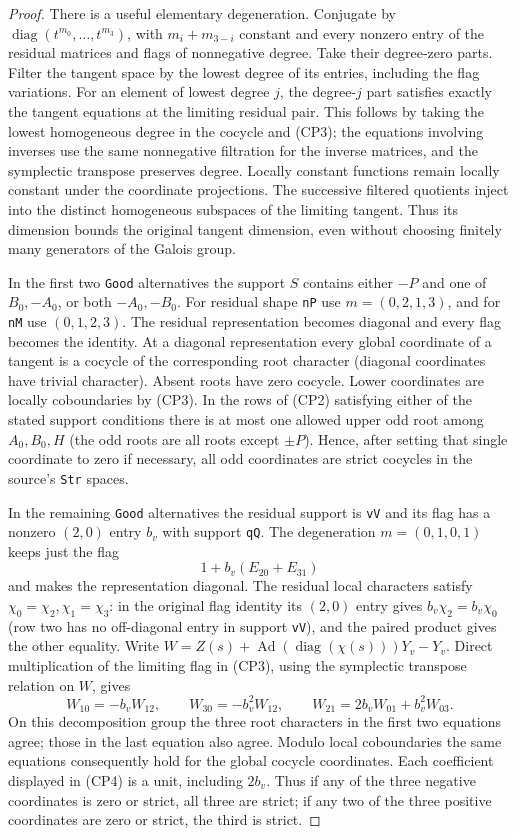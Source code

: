 \begin{proof}
There is a useful elementary degeneration. Conjugate by
$\operatorname{diag}(t^{m_0},\ldots,t^{m_3})$, with
$m_i+m_{3-i}$ constant and every nonzero entry of the
residual matrices and flags of nonnegative degree.
Take their degree-zero parts. Filter the tangent space by
the lowest degree of its entries, including the flag
variations. For an element of lowest degree $j$, the
degree-$j$ part satisfies exactly the tangent equations
at the limiting residual pair. This follows by taking
the lowest homogeneous degree in the cocycle and
(CP3); the equations involving inverses use the same
nonnegative filtration for the inverse matrices, and
the symplectic transpose preserves degree. Locally
constant functions remain locally constant under the
coordinate projections. The successive filtered
quotients inject into the distinct homogeneous subspaces
of the limiting tangent. Thus its dimension bounds
the original tangent dimension, even without choosing
finitely many generators of the Galois group.

In the first two \texttt{Good} alternatives the support
$S$ contains either $-P$ and one of $B_0,-A_0$, or
both $-A_0,-B_0$. For residual shape \texttt{nP} use
$m=(0,2,1,3)$, and for \texttt{nM} use $(0,1,2,3)$.
The residual representation becomes diagonal and every
flag becomes the identity. At a diagonal representation
every global coordinate of a tangent is a cocycle of the
corresponding root character (diagonal coordinates have
trivial character). Absent roots have zero cocycle.
Lower coordinates are locally coboundaries by (CP3).
In the rows of (CP2) satisfying either of the stated
support conditions there is at most one allowed upper
odd root among $A_0,B_0,H$ (the odd roots are all roots
except $\pm P$). Hence, after setting that single
coordinate to zero if necessary, all odd coordinates
are strict cocycles in the source's \texttt{Str} spaces.

In the remaining \texttt{Good} alternatives the residual
support is \texttt{vV} and its flag has a nonzero $(2,0)$
entry $b_v$ with support \texttt{qQ}. The degeneration
$m=(0,1,0,1)$ keeps just the flag
\[
                      1+b_v(E_{20}+E_{31})
\]
and makes the representation diagonal. The residual
local characters satisfy $\chi_0=\chi_2,\chi_1=\chi_3$:
in the original flag identity its $(2,0)$ entry gives
$b_v\chi_2=b_v\chi_0$ (row two has no off-diagonal
entry in support \texttt{vV}), and the paired product
gives the other equality. Write
$W=Z(s)+\operatorname{Ad}(\operatorname{diag}(\chi(s)))Y_v-Y_v$.
Direct multiplication of the limiting flag in (CP3),
using the symplectic transpose relation on $W$, gives
\[
 W_{10}=-b_v W_{12},\qquad
 W_{30}=-b_v^2W_{12},\qquad
 W_{21}=2b_vW_{01}+b_v^2W_{03}.                       \tag{CP4}
\]
On this decomposition group the three root characters
in the first two equations agree; those in the last
equation also agree. Modulo local coboundaries the
same equations consequently hold for the global
cocycle coordinates. Each coefficient displayed in
(CP4) is a unit, including $2b_v$. Thus if any of
the three negative coordinates is zero or strict, all
three are strict; if any two of the three positive
coordinates are zero or strict, the third is strict.


\end{proof}
